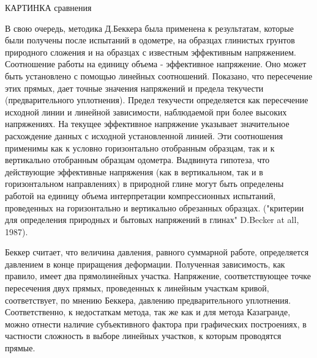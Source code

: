 КАРТИНКА сравнения

В свою очередь, методика Д.Беккера была применена к результатам, которые были получены после испытаний в одометре, на образцах глинистых грунтов природного сложения и на образцах с известным эффективным напряжением. Соотношение работы на единицу объема - эффективное напряжение. Оно может быть установлено с помощью линейных соотношений. Показано, что пересечение этих прямых, дает точные значения напряжений и предела текучести (предварительного уплотнения). Предел текучести определяется как пересечение исходной линии и линейной зависимости, наблюдаемой при более высоких напряжениях. На текущее эффективное напряжение указывает значительное расхождение данных с исходной установленной линией. Эти соотношения применимы как к условно горизонтально отобранным образцам, так и к вертикально отобранным образцам одометра. Выдвинута гипотеза, что действующие эффективные напряжения (как в вертикальном, так и в горизонтальном направлениях) в природной глине могут быть определены работой на единицу объема интерпретации компрессионных испытаний, проведенных на горизонтально и вертикально обрезанных образцах. ("критерии для определения природных и бытовых напряжений в глинах" D.Becker at all, 1987).

Беккер считает, что величина давления, равного суммарной работе, определяется давлением в конце приращения деформации. Полученная зависимость, как правило, имеет два прямолинейных участка. Напряжение, соответствующее точке пересечения двух прямых, проведенных к линейным участкам кривой, соответствует, по мнению Беккера, давлению предварительного уплотнения.
Соответственно, к недостаткам метода, так же как и для метода Казагранде, можно отнести наличие субъективного фактора при графических построениях, в частности сложность в выборе линейных участков, к которым проводятся прямые. 
